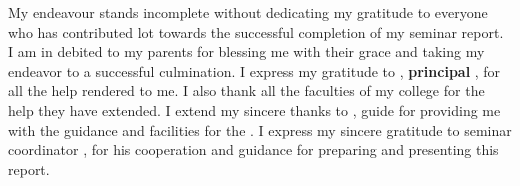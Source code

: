My endeavour stands incomplete without dedicating my gratitude to everyone who has
contributed lot towards the successful completion of my seminar report. I am in debited
to my parents for blessing me with their grace and taking my endeavor to a successful
culmination. I express my gratitude to \textbf{\guide{}}, \textbf{principal \prince{}}, \instis{} for all the help rendered
to me. I also thank all the faculties of my college for the help they have extended. I
extend my sincere thanks to \textbf{\guide{}},\reportTitle{} guide for providing me with the guidance and facilities for the \reportTitle{} . I
express my sincere gratitude to seminar coordinator \textbf{\coord{}}, for his cooperation and guidance for preparing and presenting this \reportTitle{}
report.
 
